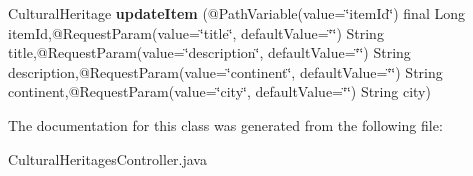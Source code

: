 \begin{DoxyCompactItemize}
\item 
\hypertarget{classcom_1_1bounswe_1_1controllers_1_1CulturalHeritagesController_adc662c6d361698e4345879d7e115046a}{}Cultural\+Heritage {\bfseries update\+Item} (@Path\+Variable(value=\char`\"{}item\+Id\char`\"{}) final Long item\+Id,@Request\+Param(value=\char`\"{}title\char`\"{}, default\+Value=\char`\"{}\char`\"{}) String title,@Request\+Param(value=\char`\"{}description\char`\"{}, default\+Value=\char`\"{}\char`\"{}) String description,@Request\+Param(value=\char`\"{}continent\char`\"{}, default\+Value=\char`\"{}\char`\"{}) String continent,@Request\+Param(value=\char`\"{}city\char`\"{}, default\+Value=\char`\"{}\char`\"{}) String city)\label{classcom_1_1bounswe_1_1controllers_1_1CulturalHeritagesController_adc662c6d361698e4345879d7e115046a}

\end{DoxyCompactItemize}


The documentation for this class was generated from the following file\+:\begin{DoxyCompactItemize}
\item 
Cultural\+Heritages\+Controller.\+java\end{DoxyCompactItemize}
